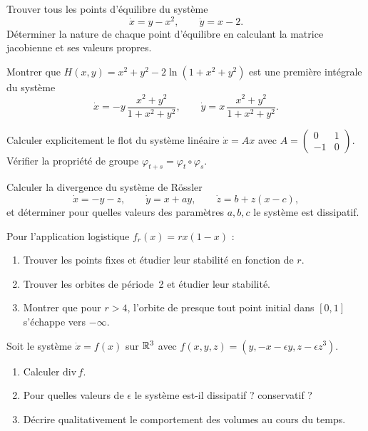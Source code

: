 \begin{exercice}
Trouver tous les points d'\'equilibre du syst\`eme
\[
    \dot{x} = y - x^2, \qquad \dot{y} = x - 2.
\]
D\'eterminer la nature de chaque point d'\'equilibre en calculant la matrice
jacobienne et ses valeurs propres.
\end{exercice}

\begin{exercice}
Montrer que $H(x, y) = x^2 + y^2 - 2\ln(1 + x^2 + y^2)$ est une premi\`ere
int\'egrale du syst\`eme
\[
    \dot{x} = -y\,\frac{x^2 + y^2}{1 + x^2 + y^2}, \qquad
    \dot{y} = x\,\frac{x^2 + y^2}{1 + x^2 + y^2}.
\]
\end{exercice}

\begin{exercice}
Calculer explicitement le flot du syst\`eme lin\'eaire
$\dot{x} = Ax$ avec $A = \begin{pmatrix} 0 & 1 \\ -1 & 0 \end{pmatrix}$.
V\'erifier la propri\'et\'e de groupe $\varphi_{t+s} = \varphi_t \circ \varphi_s$.
\end{exercice}

\begin{exercice}
Calculer la divergence du syst\`eme de R\"ossler
\[
    \dot{x} = -y - z, \qquad \dot{y} = x + ay, \qquad \dot{z} = b + z(x - c),
\]
et d\'eterminer pour quelles valeurs des param\`etres $a, b, c$ le syst\`eme
est dissipatif.
\end{exercice}

\begin{exercice}
Pour l'application logistique $f_r(x) = rx(1-x)$ :
\begin{enumerate}
    \item Trouver les points fixes et \'etudier leur stabilit\'e en fonction de $r$.
    \item Trouver les orbites de p\'eriode~2 et \'etudier leur stabilit\'e.
    \item Montrer que pour $r > 4$, l'orbite de presque tout point initial
    dans $[0,1]$ s'\'echappe vers $-\infty$.
\end{enumerate}
\end{exercice}

\begin{exercice}
Soit le syst\`eme $\dot{x} = f(x)$ sur $\mathbb{R}^3$ avec
$f(x,y,z) = (y, -x - \epsilon y, z - \epsilon z^3)$.
\begin{enumerate}
    \item Calculer $\mathrm{div}\, f$.
    \item Pour quelles valeurs de $\epsilon$ le syst\`eme est-il dissipatif ?
    conservatif ?
    \item D\'ecrire qualitativement le comportement des volumes au cours du temps.
\end{enumerate}
\end{exercice}
